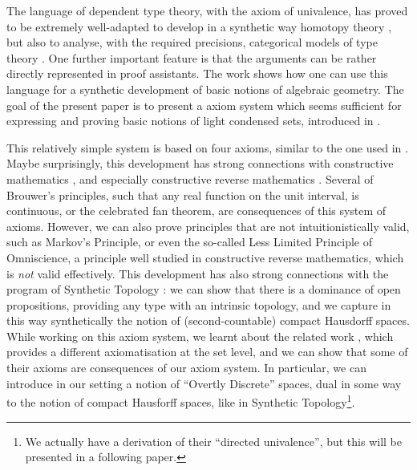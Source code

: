 The language of dependent type theory, with the axiom of univalence, has proved to be extremely well-adapted to
develop in a synthetic way homotopy theory \cite{hott}, but
also to analyse, with the required precisions, categorical models of type theory \cite{vanderweide24}. One
further important feature is that
the arguments can be rather directly represented in proof assistants. The work \cite{draft} shows how one can use
this language for a synthetic development of basic notions of algebraic geometry. The goal of the present paper
is to present a axiom system which seems sufficient for expressing and proving basic notions of light condensed
sets, introduced in \cite{Scholze}.

This relatively simple system is based on four axioms, similar to the one used
in \cite{draft}. Maybe surprisingly, this development has strong connections with constructive mathematics \cite{Bishop},
and especially constructive reverse mathematics \cite{Ishihara,Diener}. Several of Brouwer's principles, such that
any real function on the unit interval, is continuous, or the celebrated fan theorem, are consequences of this system
of axioms. However, we can also prove principles that are not intuitionistically valid, such as Markov's Principle,
or even the so-called Less Limited Principle of Omniscience, a principle well studied in constructive reverse mathematics,
which is {\em not} valid effectively.  This development has also strong connections with the program of Synthetic
Topology \cite{SyntheticTopologyEscardo,SyntheticTopologyLesnik}:
we can show that there is a dominance of open propositions, providing any type with an intrinsic
topology, and we capture in this way synthetically the notion of (second-countable) compact Hausdorff spaces.
While working on this axiom system, we learnt about the related work \cite{bc24}, which provides a different axiomatisation
at the set level, and we can show that some of their axioms are consequences of our axiom system. In particular, we can introduce
in our setting a notion of ``Overtly Discrete'' spaces, dual in some way to the notion of compact Hausforff spaces, like
in Synthetic Topology\footnote{We actually have a
derivation of their ``directed univalence'', but this will be presented in a following paper.}.

